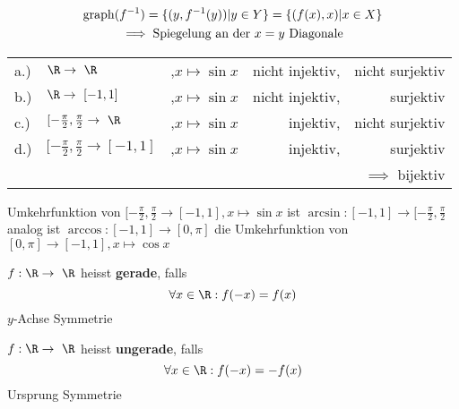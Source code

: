 \begin{bem}
	\begin{gather*}
		\graph(f^{-1}) = \{ (y , f^{-1}(y)) | y \in Y \} = \{ (f(x) , x) | x \in X \} \\
		\implies \text{Spiegelung an der $x=y$ Diagonale}
	\end{gather*}
\end{bem}
\begin{bsp*}
	\begin{tabular}{l l l r r}
		a.)	&$\R \rightarrow \R$						&,$x \mapsto \sin x$	&nicht injektiv,	&nicht surjektiv		\\
		b.)	&$\R \rightarrow [-1,1]$					&,$x \mapsto \sin x$	&nicht injektiv,	&surjektiv			\\
		c.)	&$[-\frac{\pi}{2},\frac{\pi}{2} \rightarrow \R$		&,$x \mapsto \sin x$	&injektiv,		&nicht surjektiv		\\
		d.)	&$[-\frac{\pi}{2},\frac{\pi}{2} \rightarrow [-1,1]$	&,$x \mapsto \sin x$	&injektiv,		&surjektiv			\\
			&									&				&			&$\implies$ bijektiv	
	\end{tabular}
\end{bsp*}
\begin{def*}[note = arcsin , index = arcsin]
	Umkehrfunktion von $[-\frac{\pi}{2},\frac{\pi}{2} \rightarrow [-1,1], x \mapsto \sin x$ ist $\arcsin: [-1,1] \rightarrow [-\frac{\pi}{2},\frac{\pi}{2}$\\
	analog ist $\arccos: [-1,1] \rightarrow [0,\pi]$ die Umkehrfunktion von $[0,\pi] \rightarrow [-1,1], x \mapsto \cos x$
\end{def*}
\begin{bsp*}
	\begin{gather*}
		[0,\infty[ \rightarrow [0,\infty[, x \mapsto x^n \qquad |n \in \R^{>0} \qquad \text{bijektiv} \\
		\intertext{Umkehrfunktion:}
		[0,\infty[ \rightarrow [0,\infty[, y \mapsto y^{\frac{1}{n}} \qquad \text{Wurzelfunktion}
	\end{gather*}
\end{bsp*}
\begin{def*}[note = gerade , index = gerade]
	$f: \R \rightarrow \R$ heisst \textbf{gerade}, falls\\
	\[ \forall x \in \R : f(-x) = f(x) \]
	$y$-Achse Symmetrie
\end{def*}
\begin{def*}[note = ungerade , index = ungerade]
	$f: \R \rightarrow \R$ heisst \textbf{ungerade}, falls\\
	\[ \forall x \in \R : f(-x) = -f(x) \]
	Ursprung Symmetrie
\end{def*}
